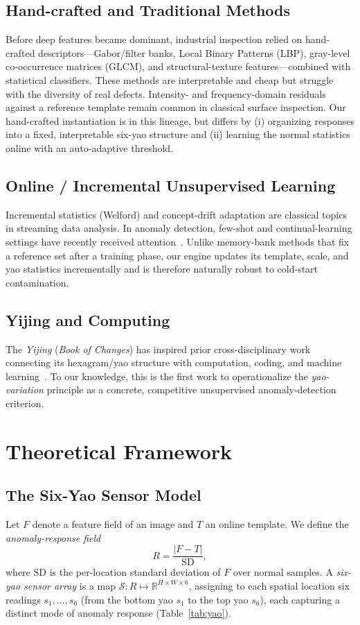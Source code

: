 \documentclass[preprint,12pt]{elsarticle}
\begin{document}
\subsection{Hand-crafted and Traditional Methods}
Before deep features became dominant, industrial inspection relied on
hand-crafted descriptors---Gabor/filter banks, Local Binary Patterns
(LBP), gray-level co-occurrence matrices (GLCM), and structural-texture
features---combined with statistical classifiers. These methods are
interpretable and cheap but struggle with the diversity of real defects.
Intensity- and frequency-domain residuals against a reference template
remain common in classical surface inspection. Our hand-crafted
instantiation is in this lineage, but differs by (i) organizing responses
into a fixed, interpretable six-yao structure and (ii) learning the normal
statistics online with an auto-adaptive threshold.

\subsection{Online / Incremental Unsupervised Learning}
Incremental statistics (Welford) and concept-drift adaptation are
classical topics in streaming data analysis. In anomaly detection,
few-shot and continual-learning settings have recently received
attention~\cite{jeong2023winclip}. Unlike memory-bank methods that fix a reference
set after a training phase, our engine updates its template, scale, and
yao statistics incrementally and is therefore naturally robust to
cold-start contamination.

\subsection{Yijing and Computing}
The \emph{Yijing} (\emph{Book of Changes}) has inspired prior
cross-disciplinary work connecting its hexagram/yao structure with
computation, coding, and machine learning~\cite{zhang2020yijing}. To our knowledge,
this is the first work to operationalize the \emph{yao-variation}
principle as a concrete, competitive unsupervised anomaly-detection
criterion.

\section{Theoretical Framework}
\label{sec:framework}
\subsection{The Six-Yao Sensor Model}
Let $F$ denote a feature field of an image and $T$ an online template.
We define the \emph{anomaly-response field}
\begin{equation}
R = \frac{|F - T|}{\mathrm{SD}},
\end{equation}
where $\mathrm{SD}$ is the per-location standard deviation of $F$ over
normal samples. A \emph{six-yao sensor array} is a map
$\mathcal{S}: R \mapsto \mathbb{R}^{H\times W\times 6}$, assigning to each
spatial location six readings $s_1,\dots,s_6$ (from the bottom yao
$s_1$ to the top yao $s_6$),
each capturing a distinct mode of anomaly response (Table~\ref{tab:yao}).
\end{document}
